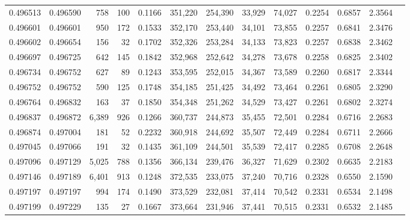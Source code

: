 \begin{tabular}{rrrrrrrrrrrrr}
0.496513 & 0.496590 &   758 &   100 &                                     0.1166 & 351,220 & 254,390 &  33,929 &  74,027 & 0.2254 & 0.6857 & 2.3564 \\
0.496601 & 0.496601 &   950 &   172 &                                     0.1533 & 352,170 & 253,440 &  34,101 &  73,855 & 0.2257 & 0.6841 & 2.3476 \\
0.496602 & 0.496654 &   156 &    32 &                                     0.1702 & 352,326 & 253,284 &  34,133 &  73,823 & 0.2257 & 0.6838 & 2.3462 \\
0.496697 & 0.496725 &   642 &   145 &                                     0.1842 & 352,968 & 252,642 &  34,278 &  73,678 & 0.2258 & 0.6825 & 2.3402 \\
0.496734 & 0.496752 &   627 &    89 &                                     0.1243 & 353,595 & 252,015 &  34,367 &  73,589 & 0.2260 & 0.6817 & 2.3344 \\
0.496752 & 0.496752 &   590 &   125 &                                     0.1748 & 354,185 & 251,425 &  34,492 &  73,464 & 0.2261 & 0.6805 & 2.3290 \\
0.496764 & 0.496832 &   163 &    37 &                                     0.1850 & 354,348 & 251,262 &  34,529 &  73,427 & 0.2261 & 0.6802 & 2.3274 \\
0.496837 & 0.496872 & 6,389 &   926 &                                     0.1266 & 360,737 & 244,873 &  35,455 &  72,501 & 0.2284 & 0.6716 & 2.2683 \\
0.496874 & 0.497004 &   181 &    52 &                                     0.2232 & 360,918 & 244,692 &  35,507 &  72,449 & 0.2284 & 0.6711 & 2.2666 \\
0.497045 & 0.497066 &   191 &    32 &                                     0.1435 & 361,109 & 244,501 &  35,539 &  72,417 & 0.2285 & 0.6708 & 2.2648 \\
0.497096 & 0.497129 & 5,025 &   788 &                                     0.1356 & 366,134 & 239,476 &  36,327 &  71,629 & 0.2302 & 0.6635 & 2.2183 \\
0.497146 & 0.497189 & 6,401 &   913 &                                     0.1248 & 372,535 & 233,075 &  37,240 &  70,716 & 0.2328 & 0.6550 & 2.1590 \\
0.497197 & 0.497197 &   994 &   174 &                                     0.1490 & 373,529 & 232,081 &  37,414 &  70,542 & 0.2331 & 0.6534 & 2.1498 \\
0.497199 & 0.497229 &   135 &    27 &                                     0.1667 & 373,664 & 231,946 &  37,441 &  70,515 & 0.2331 & 0.6532 & 2.1485 \\

\end{tabular}
